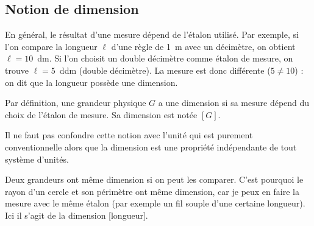\subsection{Notion de dimension}
En général, le résultat d'une mesure dépend de l'étalon utilisé. Par exemple, si l'on compare la longueur $\ell$ d'une règle de 1~m avec un décimètre, on obtient $\ell=10$~dm. Si l'on choisit un double décimètre comme étalon de mesure, on trouve $\ell=5$~ddm (double décimètre). La mesure est donc différente ($5\neq 10$) : on dit que  la longueur possède une dimension.
\newpage
\begin{kaobox}[frametitle=Dimension d'une grandeur]
Par définition, une grandeur physique $G$ a une dimension si sa mesure dépend du choix de l'étalon de mesure. Sa dimension est notée $[G]$.
\end{kaobox}
Il ne faut pas confondre cette notion avec l'unité qui est purement conventionnelle alors que la dimension est une propriété indépendante de tout système d'unités.

Deux grandeurs ont même dimension si on peut les comparer. C'est pourquoi le rayon d'un cercle et son périmètre ont même dimension, car je peux en faire la mesure avec le même étalon (par exemple un fil souple d'une certaine longueur). Ici il s'agit de la dimension [longueur].

